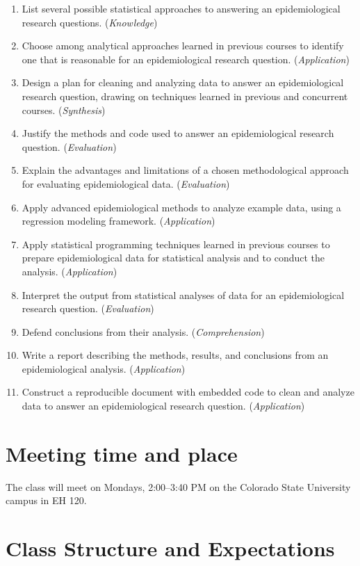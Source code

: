 \documentclass[
]{book}
\providecommand{\tightlist}{%
  \setlength{\itemsep}{0pt}\setlength{\parskip}{0pt}}
\begin{document}
\begin{enumerate}
\def\labelenumi{\arabic{enumi}.}
\tightlist
\item
  List several possible statistical approaches to answering an epidemiological
  research questions. (\emph{Knowledge})
\item
  Choose among analytical approaches learned in previous courses to identify
  one that is reasonable for an epidemiological research question. (\emph{Application})
\item
  Design a plan for cleaning and analyzing data to answer an epidemiological
  research question, drawing on techniques learned in previous and concurrent
  courses. (\emph{Synthesis})
\item
  Justify the methods and code used to answer an epidemiological research
  question. (\emph{Evaluation})
\item
  Explain the advantages and limitations of a chosen methodological approach
  for evaluating epidemiological data. (\emph{Evaluation})
\item
  Apply advanced epidemiological methods to analyze example data, using a
  regression modeling framework. (\emph{Application})
\item
  Apply statistical programming techniques learned in previous courses to
  prepare epidemiological data for statistical analysis and to conduct the
  analysis. (\emph{Application})
\item
  Interpret the output from statistical analyses of data for an epidemiological
  research question. (\emph{Evaluation})
\item
  Defend conclusions from their analysis. (\emph{Comprehension})
\item
  Write a report describing the methods, results, and conclusions from an
  epidemiological analysis. (\emph{Application})
\item
  Construct a reproducible document with embedded code to clean and analyze
  data to answer an epidemiological research question. (\emph{Application})
\end{enumerate}

\section{Meeting time and place}\label{meeting-time-and-place}

The class will meet on Mondays, 2:00--3:40 PM on the Colorado State University
campus in EH 120.

\section{Class Structure and Expectations}\label{class-structure-and-expectations}
\end{document}
